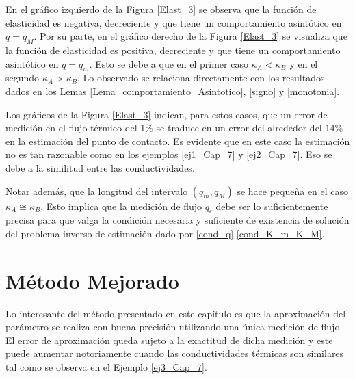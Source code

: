 En el gr\'afico izquierdo de la Figura \ref{Elast_3} se observa que la funci\'on de elasticidad es negativa, decreciente y que tiene un comportamiento asint\'otico en $q=q_M$.
Por su parte, en el gr\'afico derecho de la Figura \ref{Elast_3} se visualiza que la funci\'on de elasticidad es positiva, decreciente y que tiene un comportamiento asint\'otico en $q=q_m$.
 Esto se debe a que 
en el primer caso  $\kappa_A<\kappa_B$ y en el segundo $\kappa_A>\kappa_B$. Lo observado se relaciona directamente con los resultados dados en los Lemas \ref{Lema_comportamiento_Asintotico}, \ref{signo} y \ref{monotonia}. 

Los gr\'aficos de la Figura \ref{Elast_3} indican, para estos casos, que un error de medici\'on en el flujo t\'ermico del $1 \%$ se traduce en un error del alrededor del $14 \%$ en la estimaci\'on del punto de contacto.
Es evidente que en este caso la estimaci\'on no es tan razonable como en los ejemplos \ref{ej1_Cap_7} y \ref{ej2_Cap_7}. Eso se debe a la similitud entre las conductividades.  

Notar adem\'as, que la longitud del intervalo $(q_m,q_M)$ se hace peque\~na en el caso $\kappa_A \cong \kappa_B$. Esto implica que la medici\'on de flujo $q_\epsilon$ debe ser lo suficientemente precisa para que valga la condici\'on necesaria y suficiente de existencia de soluci\'on del problema inverso de estimaci\'on
dado por \eqref{cond_q}-\eqref{cond_K_m_K_M}. 
%

\section{M\'etodo Mejorado} \label{sec:Met_mej}

Lo interesante del m\'etodo presentado en este cap\'itulo es que la aproximaci\'on del par\'ametro se realiza con buena precisi\'on utilizando una \'unica medici\'on de flujo. 
El error de aproximaci\'on queda sujeto a la exactitud de dicha medici\'on y este puede aumentar notoriamente cuando las conductividades t\'ermicas son similares 
tal como se observa en el Ejemplo \ref{ej3_Cap_7}. 

